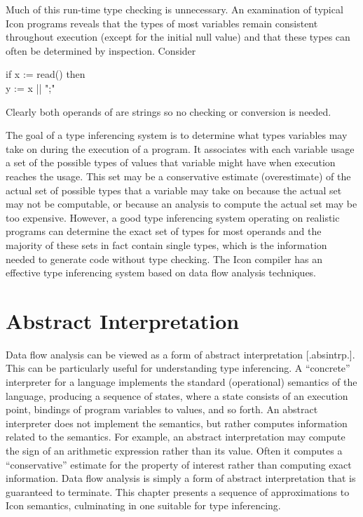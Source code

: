 Much of this run-time type checking is unnecessary. An examination of
typical Icon programs reveals that the types of most variables remain
consistent throughout execution (except for the initial null value)
and that these types can often be determined by inspection. Consider

\goodbreak
\begin{iconcode}
if x := read() then\\
\>y := x || ";"\\
\end{iconcode}


Clearly both operands of {\textbar}{\textbar} are strings so no
checking or conversion is needed.

The goal of a type inferencing system is to determine what types
variables may take on during the execution of a program. It associates
with each variable usage a set of the possible types of values that
variable might have when execution reaches the usage. This set may be
a conservative estimate (overestimate) of the actual set of possible
types that a variable may take on because the actual set may not be
computable, or because an analysis to compute the actual set may be
too expensive. However, a good type inferencing system operating on
realistic programs can determine the exact set of types for most
operands and the majority of these sets in fact contain single types,
which is the information needed to generate code without type
checking. The Icon compiler has an effective type inferencing system
based on data flow analysis techniques.

\section{Abstract Interpretation }

Data flow analysis can be viewed as a form of abstract interpretation
[.absintrp.]. This can be particularly useful for understanding type
inferencing. A ``concrete'' interpreter for a language implements the
standard (operational) semantics of the language, producing a sequence
of states, where a state consists of an execution point, bindings of
program variables to values, and so forth. An abstract interpreter
does not implement the semantics, but rather computes information
related to the semantics. For example, an abstract interpretation may
compute the sign of an arithmetic expression rather than its
value. Often it computes a ``conservative'' estimate for the property
of interest rather than computing exact information. Data flow
analysis is simply a form of abstract interpretation that is
guaranteed to terminate. This chapter presents a sequence of
approximations to Icon semantics, culminating in one suitable for type
inferencing.

